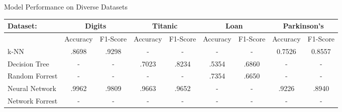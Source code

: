 \documentclass{article}
\begin{document}

\vspace*{\fill}

\begin{center}
    {\large Model Performance on Diverse Datasets}
    \begin{table}[h]
    \begin{tabular}{l|cc|cc|cc|cc}
    Dataset:             & \multicolumn{2}{c|}{Digits}                                   & \multicolumn{2}{c|}{Titanic}                                  & \multicolumn{2}{c|}{Loan}                                     & \multicolumn{2}{c}{Parkinson's}                               \\ \hline
                         & Accuracy                      & F1-Score                      & Accuracy                      & F1-Score                      & Accuracy                      & F1-Score                      & Accuracy                      & F1-Score                      \\ \cline{2-9} 
    k-NN                 & .8698                         & .9298                         & -                             & -                             & -                             & -                             & 0.7526                        & 0.8557                             \\
    Decision Tree        & -                             & -                             & .7023                         & .8234                         & .5354                         & \cellcolor[HTML]{C0C0C0}.6860 & -                             & -                             \\
    Random Forrest       & -                             & -                             & -                             & -                             & \cellcolor[HTML]{C0C0C0}.7354 & .6650                         & -                             & -                             \\
    Neural Network       & \cellcolor[HTML]{C0C0C0}.9962 & \cellcolor[HTML]{C0C0C0}.9809 & \cellcolor[HTML]{C0C0C0}.9663 & \cellcolor[HTML]{C0C0C0}.9652 & -                             & -                             & \cellcolor[HTML]{C0C0C0}.9226 & \cellcolor[HTML]{C0C0C0}.8940 \\
    Network Forrest & -                            & -                             & -                             & -                             & -                             & -                             & -                             & -                            
    \end{tabular}
    \end{table}
\end{center}
\end{document}
